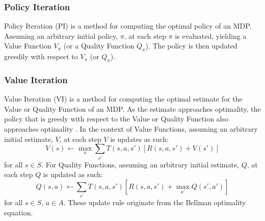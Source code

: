 \subsubsection{Policy Iteration}
Policy Iteration (PI) \citep{Bellman:1957, howard:dp} is a method for computing the optimal policy of an MDP. Assuming an arbitrary initial policy, $\pi$, at each step $\pi$ is evaluated, yielding a Value Function $V_\pi$ (or a Quality Function $Q_\pi$). The policy is then updated greedily with respect to $V_\pi$ (or $Q_\pi$).
\subsubsection{Value Iteration}
Value Iteration (VI) \cite{Bellman:1957} is a method for computing the optimal estimate for the Value or Quality Function of an MDP. As the estimate approaches optimality, the policy that is greedy with respect to the Value or Quality Function also approaches optimality \citep{series/synthesis/2010Szepesvari}.
In the context of Value Functions, assuming an arbitrary initial estimate, $V$, at each step $V$ is updates as such:
\begin{equation}
\label{eqn:vupdate}
V(s) \leftarrow \max_a\sum_{s'}T(s, a, s')[R(s, a, s')+V(s')]
\end{equation}
for all $s \in S$.
For Quality Functions, assuming an arbitrary initial estimate, $Q$, at each step $Q$ is updated as such:
\begin{equation}
\label{eqn:qupdate}
Q(s,a) \leftarrow \sum_{s'}T(s,a,s')[R(s,a,s') + \max_{a'}Q(s',a')]
\end{equation}
for all $s \in S$, $a \in A$. These update rule originate from the Bellman optimality equation.
